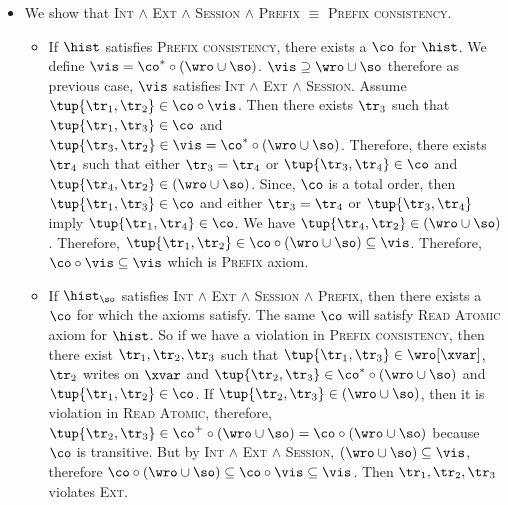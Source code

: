 \begin{itemize}
 \item We show that \textsc{Int} $\land$ \textsc{Ext} $\land$ \textsc{Session} $\land$ \textsc{Prefix} $\equiv$ \textsc{Prefix consistency}.
       \begin{itemize}
        \item If $\hist$ satisfies \textsc{Prefix consistency}, there exists a $\co$ for $\hist$. We define $\vis = \co^* \circ (\wro \cup \so)$.
              $\vis \supseteq \wro \cup \so$ therefore as previous case, $\vis$ satisfies \textsc{Int} $\land$ \textsc{Ext} $\land$ \textsc{Session}.
              Assume $\tup{\tr_1, \tr_2} \in \co \circ \vis$. 
              Then there exists $\tr_3$ such that $\tup{\tr_1, \tr_3} \in \co$ and $\tup{\tr_3, \tr_2} \in \vis = \co^* \circ (\wro \cup \so)$. Therefore, there exists $\tr_4$ such that either $\tr_3 = \tr_4$ or $\tup{\tr_3, \tr_4} \in \co$ and $\tup{\tr_4, \tr_2} \in (\wro \cup \so)$. Since, $\co$ is a total order, then $\tup{\tr_1, \tr_3} \in \co$ and either $\tr_3 = \tr_4$ or $\tup{\tr_3, \tr_4}$ imply $\tup{\tr_1, \tr_4} \in \co$. We have $\tup{\tr_4, \tr_2} \in (\wro \cup \so)$. Therefore, $\tup{\tr_1, \tr_2} \in \co \circ (\wro \cup \so) \subseteq \vis$. Therefore, $\co \circ \vis \subseteq \vis$ which is \textsc{Prefix} axiom.
              
        \item If $\hist_{\so}$ satisfies \textsc{Int} $\land$ \textsc{Ext} $\land$ \textsc{Session} $\land$ \textsc{Prefix}, then there exists a $\co$ for which the axioms satisfy. The same $\co$ will satisfy \textsc{Read Atomic} axiom for $\hist$. So if we have a violation in \textsc{Prefix consistency}, then there exist $\tr_1, \tr_2, \tr_3$ such that $\tup{\tr_1, \tr_3} \in \wro[\xvar]$, $\tr_2$ writes on $\xvar$ and $\tup{\tr_2, \tr_3} \in \co^* \circ (\wro \cup \so)$ and $\tup{\tr_1, \tr_2} \in \co$. If $\tup{\tr_2, \tr_3} \in (\wro \cup \so)$, then it is violation in \textsc{Read Atomic}, therefore, $\tup{\tr_2, \tr_3} \in \co^+ \circ (\wro \cup \so) = \co \circ (\wro \cup \so)$ because $\co$ is transitive. But by \textsc{Int} $\land$ \textsc{Ext} $\land$ \textsc{Session}, $(\wro \cup \so) \subseteq \vis$, therefore $\co \circ (\wro \cup \so) \subseteq \co \circ \vis \subseteq \vis$. Then $\tr_1, \tr_2, \tr_3$ violates \textsc{Ext}.
              
           
       \end{itemize}
       
       

\end{itemize}
